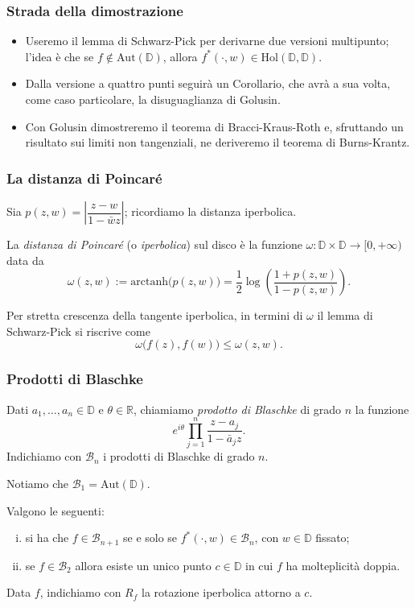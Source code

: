 \begin{frame}
  \frametitle{Strada della dimostrazione}
  \begin{itemize}
    \item Useremo il lemma di Schwarz-Pick per derivarne due versioni multipunto; l'idea è che se $f \not\in \text{Aut}(\mathbb{D})$, allora $f^*(\cdot,w) \in \text{Hol}(\mathbb{D},\mathbb{D})$.
    \pause
    \item Dalla versione a quattro punti seguirà un Corollario, che avrà a sua volta, come caso particolare, la disuguaglianza di Golusin.
    \pause
    \item Con Golusin dimostreremo il teorema di Bracci-Kraus-Roth e, sfruttando un risultato sui limiti non tangenziali, ne deriveremo il teorema di Burns-Krantz.
  \end{itemize}
\end{frame}

\begin{frame}
  \frametitle{La distanza di Poincaré}
  Sia $p(z,w)=\left|\dfrac{z-w}{1-\bar{w}z}\right|$; ricordiamo la distanza iperbolica. \pause
  \begin{defn}
    La \textit{distanza di Poincaré} (o \textit{iperbolica}) sul disco è la funzione $\omega:\mathbb{D}\times \mathbb{D} \longrightarrow [0,+\infty)$ data da
    $$\omega(z,w):=\text{arctanh}\bigl(p(z,w)\bigr)=\frac{1}{2}\log\left(\frac{1+p(z,w)}{1-p(z,w)}\right).$$
  \end{defn}
  \pause
  Per stretta crescenza della tangente iperbolica, in termini di $\omega$ il lemma di Schwarz-Pick si riscrive come
  $$\omega\bigl(f(z),f(w)\bigr) \le \omega(z,w).$$
\end{frame}

\begin{frame}
  \frametitle{Prodotti di Blaschke}
  \begin{defn}
    Dati $a_1,\dots,a_n \in \mathbb{D}$ e $\theta \in \mathbb{R}$, chiamiamo \textit{prodotto di Blaschke} di grado $n$ la funzione
    $$e^{i\theta}\prod_{j=1}^n \frac{z-a_j}{1-\bar{a}_jz}.$$
    Indichiamo con $\mathcal{B}_n$ i prodotti di Blaschke di grado $n$.
  \end{defn}
  \pause
  Notiamo che $\mathcal{B}_1=\text{Aut}(\mathbb{D})$.
  \pause
  \begin{prop}
    Valgono le seguenti:
    \begin{enumerate}[(i)]
      \item si ha che $f \in \mathcal{B}_{n+1}$ se e solo se $f^*(\cdot,w) \in \mathcal{B}_n$, con $w \in \mathbb{D}$ fissato;
      \item se $f \in \mathcal{B}_2$ allora esiste un unico punto $c \in \mathbb{D}$ in cui $f$ ha molteplicità doppia.
    \end{enumerate}
  \end{prop}
  \pause
  Data $f$, indichiamo con $R_f$ la rotazione iperbolica attorno a $c$.
\end{frame}


